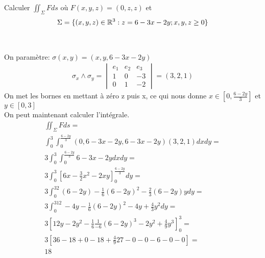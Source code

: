 \begin{myExample}
	Calculer $\iint_\Sigma Fds$ où $F(x,y,z)=(0,z,z)$ et  
	\begin{eqnarray*}
		\Sigma=\{(x,y,z)\in\mathbb{R}^3:z=6-3x-2y;x,y,z\geq0\}
	\end{eqnarray*}
	\\\\
	On paramètre: $\sigma(x,y)=(x,y,6-3x-2y)$
	\begin{eqnarray*}
		\sigma_x \wedge \sigma_y=
		\begin{vmatrix}
		e_1&e_2&e_3
		\\
		1&0&-3
		\\
		0&1&-2
		\end{vmatrix}
		=(3,2,1)
	\end{eqnarray*}
	On met les bornes en mettant à zéro z puis x, ce qui nous donne $x\in[0,\frac{6-2y}{3}]$ et $y\in[0,3]$
	\\On peut maintenant calculer l'intégrale.
	\begin{eqnarray*}
		\iint_\Sigma Fds=
		\\
		\int_0^3\int_0^{\frac{6-2y}{3}}(0,6-3x-2y,6-3x-2y)(3,2,1)dxdy=
		\\
		3\int_0^3\int_0^{\frac{6-2y}{3}}6-3x-2ydxdy=
		\\
		3\int_0^3\left[6x-\frac{3}{2}x^2-2xy\right]_{0}^{\frac{6-2y}{3}}dy=
		\\
		3\int_0^32(6-2y)-\frac{1}{6}(6-2y)^2-\frac{2}{3}(6-2y)ydy=
		\\
		3\int_0^312-4y-\frac{1}{6}(6-2y)^2-4y+\frac{4}{3}y^2dy=
		\\
		3\left[12y-2y^2-\frac{1}{6}\frac{1}{-6}(6-2y)^3-2y^2+\frac{4}{9}y^3\right]_0^3=
		\\
		3\left[36-18+0-18+\frac{4}{9}27-0-0-6-0-0\right]=
		\\
		18
	\end{eqnarray*}
\end{myExample}